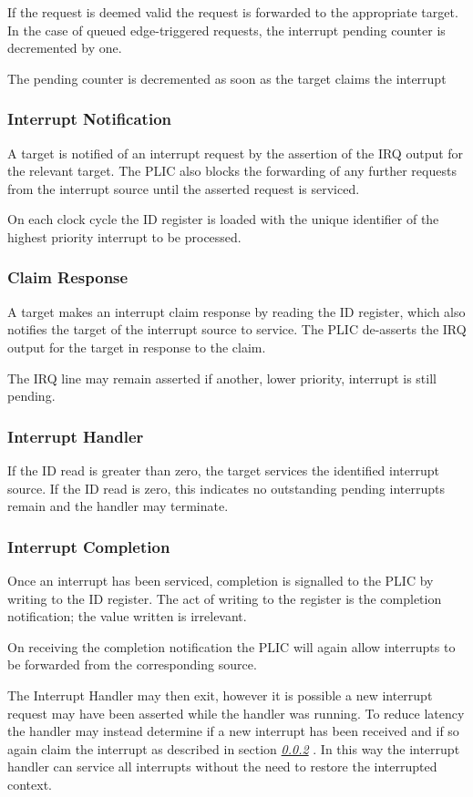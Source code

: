 If the request is deemed valid the request is forwarded to the
appropriate target. In the case of queued edge-triggered requests, the
interrupt pending counter is decremented by one.

\comment
The pending counter is decremented as soon as the target claims the interrupt
\endcomment

\subsubsection{Interrupt Notification}

A target is notified of an interrupt request by the assertion of the IRQ
output for the relevant target. The PLIC also blocks the forwarding of
any further requests from the interrupt source until the asserted
request is serviced.

On each clock cycle the ID register is loaded with the unique identifier
of the highest priority interrupt to be processed.

\subsubsection{Claim Response} \label{sec:claim-response}

A target makes an interrupt claim response by reading the ID register,
which also notifies the target of the interrupt source to service. The
PLIC de-asserts the IRQ output for the target in response to the claim.

\comment
The IRQ line may remain asserted if another, lower priority, interrupt is still pending.
\endcomment


\subsubsection{Interrupt Handler}

If the ID read is greater than zero, the target services the identified
interrupt source. If the ID read is zero, this indicates no outstanding
pending interrupts remain and the handler may terminate.

\subsubsection{Interrupt Completion}

Once an interrupt has been serviced, completion is signalled to the PLIC
by writing to the ID register. The act of writing to the register is the
completion notification; the value written is irrelevant.

On receiving the completion notification the PLIC will again allow
interrupts to be forwarded from the corresponding source.

The Interrupt Handler may then exit, however it is possible a new
interrupt request may have been asserted while the handler was running.
To reduce latency the handler may instead determine if a new interrupt
has been received and if so again claim the interrupt as described in
section \emph{\ref{sec:claim-response} }. In this
way the interrupt handler can service all interrupts without the need to
restore the interrupted context.
